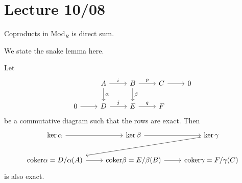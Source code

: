 \section{Lecture 10/08}
Coproducts in Mod$_R$ is direct sum.

We state the snake lemma here.
\begin{prop}
    Let \[\begin{tikzcd}
        & A & B & C & 0 \\
        0 & D & E & F
        \arrow["i", from=1-2, to=1-3]
        \arrow["\alpha", from=1-2, to=2-2]
        \arrow["p", from=1-3, to=1-4]
        \arrow["\beta", from=1-3, to=2-3]
        \arrow[from=1-4, to=1-5]
        \arrow[from=2-1, to=2-2]
        \arrow["j", from=2-2, to=2-3]
        \arrow["q", from=2-3, to=2-4]
    \end{tikzcd}\]
    be a commutative diagram such that the rows are exact. Then 
    \[\begin{tikzcd}
        {\ker\alpha} & {\ker\beta} & {\ker\gamma} \\
        {\text{coker} \alpha=D/\alpha(A)} & {\text{coker}\beta=E/\beta(B)} & {\text{coker}\gamma=F/\gamma(C)}
        \arrow[from=1-1, to=1-2]
        \arrow[from=1-2, to=1-3]
        \arrow[from=1-3, to=2-1]
        \arrow[from=2-1, to=2-2]
        \arrow[from=2-2, to=2-3]
    \end{tikzcd}\]
    is also exact.
\end{prop}


